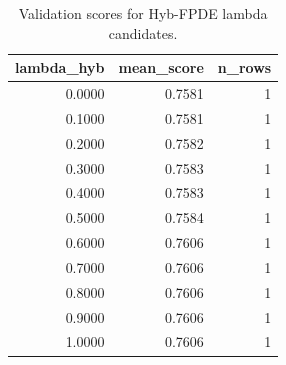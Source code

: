 \begin{table}[t]
\caption{Validation scores for Hyb-FPDE lambda candidates.}
\label{tab:lambda_distribution_computed}
\centering
\begin{tabular}{rrr}
\toprule
lambda\_hyb & mean\_score & n\_rows \\
\midrule
0.0000 & 0.7581 & 1 \\
0.1000 & 0.7581 & 1 \\
0.2000 & 0.7582 & 1 \\
0.3000 & 0.7583 & 1 \\
0.4000 & 0.7583 & 1 \\
0.5000 & 0.7584 & 1 \\
0.6000 & 0.7606 & 1 \\
0.7000 & 0.7606 & 1 \\
0.8000 & 0.7606 & 1 \\
0.9000 & 0.7606 & 1 \\
1.0000 & 0.7606 & 1 \\
\bottomrule
\end{tabular}

\end{table}
